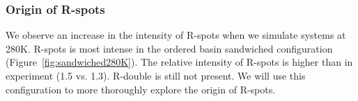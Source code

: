\documentclass[journal=jpcbfk,manusciprt=article]{achemso}
\begin{document}
%

  \subsubsection{Origin of R-spots}\label{section:rspots}

  We observe an increase in the intensity of R-spots when we simulate systems at 280K. R-spots
  is most intense in the ordered basin sandwiched configuration (Figure~\ref{fig:sandwiched280K}). 
  The relative intensity of R-spots is higher than in experiment (1.5 vs. 1.3). R-double is still
  not present. We will use this configuration to more thoroughly explore the origin of R-spots.
  
\end{document}
